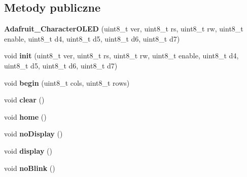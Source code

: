 \subsection*{Metody publiczne}
\begin{DoxyCompactItemize}
\item 
\mbox{\label{class_adafruit___character_o_l_e_d_a26e5aee579959b554dfaa4b633db7174}} 
{\bfseries Adafruit\+\_\+\+Character\+O\+L\+ED} (uint8\+\_\+t ver, uint8\+\_\+t rs, uint8\+\_\+t rw, uint8\+\_\+t enable, uint8\+\_\+t d4, uint8\+\_\+t d5, uint8\+\_\+t d6, uint8\+\_\+t d7)
\item 
\mbox{\label{class_adafruit___character_o_l_e_d_ab99c3b4e96afea91730592715a04f384}} 
void {\bfseries init} (uint8\+\_\+t ver, uint8\+\_\+t rs, uint8\+\_\+t rw, uint8\+\_\+t enable, uint8\+\_\+t d4, uint8\+\_\+t d5, uint8\+\_\+t d6, uint8\+\_\+t d7)
\item 
\mbox{\label{class_adafruit___character_o_l_e_d_a25377175284b94ea073e3bb64e5de663}} 
void {\bfseries begin} (uint8\+\_\+t cols, uint8\+\_\+t rows)
\item 
\mbox{\label{class_adafruit___character_o_l_e_d_a9a0a5987d1942873983453122d510e4e}} 
void {\bfseries clear} ()
\item 
\mbox{\label{class_adafruit___character_o_l_e_d_a096da25cd264fbbc6d809b0e04870102}} 
void {\bfseries home} ()
\item 
\mbox{\label{class_adafruit___character_o_l_e_d_aacef079ba002afafd6d9b411fb0ce74e}} 
void {\bfseries no\+Display} ()
\item 
\mbox{\label{class_adafruit___character_o_l_e_d_a0a3048e9fc53a238c66469c4247c1665}} 
void {\bfseries display} ()
\item 
\mbox{\label{class_adafruit___character_o_l_e_d_a987f442faa2905a18ef512856e7028c7}} 
void {\bfseries no\+Blink} ()
\item 
\mbox{\label{class_adafruit___character_o_l_e_d_a173a92682a1d8ca66bc48a6e6d4a76ac}} 

\end{DoxyCompactItemize}
